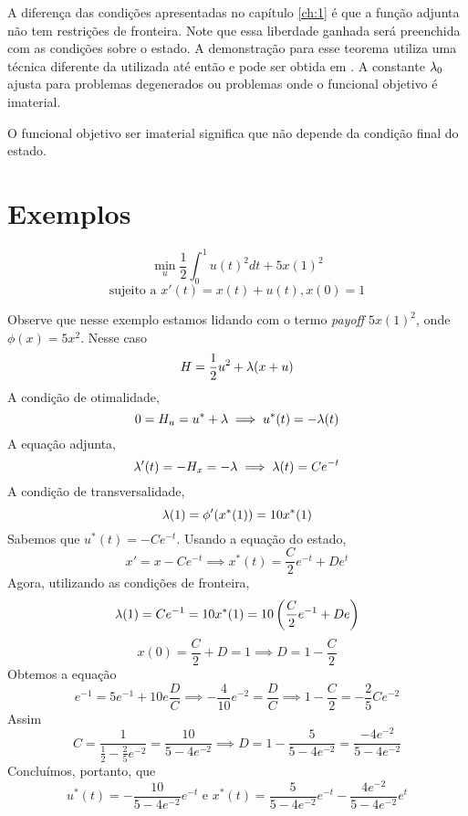 A diferença das condições apresentadas no capítulo \ref{ch:1} é que a função
adjunta não tem restrições de fronteira. Note que essa liberdade ganhada será
preenchida com as condições sobre o estado. A demonstração para esse teorema
utiliza uma técnica diferente da utilizada até então e pode ser obtida em \cite[147-153]{kamien2012dynamic}. A constante $\lambda_0$ ajusta para
problemas degenerados ou problemas onde o funcional objetivo é imaterial. 

\begin{definition}
    O funcional objetivo ser imaterial significa que não depende da condição final do estado. 
\end{definition}

\section{Exemplos}

\begin{example}
    \begin{equation*}
        \min_u \frac{1}{2}\int_0^1 u(t)^2 dt + 5x(1)^2 
    \end{equation*}
    \begin{equation*}
        \text{sujeito a  }x'(t) = x(t) + u(t), x(0) = 1
    \end{equation*}
\end{example}

Observe que nesse exemplo estamos lidando com o termo \textit{payoff}
$5x(1)^2$, onde $\phi(x) = 5x^2$. Nesse caso
$$
H = \frac{1}{2}u^2 + \lambda(x + u)
$$
A condição de otimalidade, 
$$
0 = H_u = u^* + \lambda \implies u^*(t) = - \lambda(t)
$$
A equação adjunta, 
$$
\lambda '(t) = - H_x = - \lambda \implies \lambda(t) = Ce^{-t}
$$
A condição de transversalidade,
$$
\lambda(1) = \phi '(x^*(1)) = 10x^*(1)
$$
Sabemos que $u^*(t) = -Ce^{-t}$. Usando a equação do estado, 
$$
x' = x - Ce^{-t} \implies x^{*}(t) = \frac{C}{2}e^{-t} + De^t
$$
Agora, utilizando as condições de fronteira,  
$$
\lambda(1) = Ce^{-1} = 10x^*(1) = 10\left(\frac{C}{2}e^{-1} + De\right)
$$
$$
x(0) = \frac{C}{2} + D = 1 \implies D = 1 - \frac{C}{2}
$$
Obtemos a equação
$$
e^{-1} = 5e^{-1} + 10e\frac{D}{C} \implies -\frac{4}{10}e^{-2} = \frac{D}{C} \implies 1 - \frac{C}{2} = -\frac{2}{5}Ce^{-2}
$$
Assim 
$$
C = \frac{1}{\frac{1}{2} - \frac{2}{5} e^{-2}} = \frac{10}{5 - 4e^{-2}} \implies D = 1 - \frac{5}{5 - 4e^{-2}} = \frac{-4e^{-2}}{5 - 4e^{-2}}
$$
Concluímos, portanto, que 
$$
u^{*}(t) = - \frac{10}{5 - 4e^{-2}}e^{-t} \text{ e }
x^{*}(t) = \frac{5}{5 - 4e^{-2}}e^{-t} - \frac{4e^{-2}}{5 - 4e^{-2}}e^t
$$


